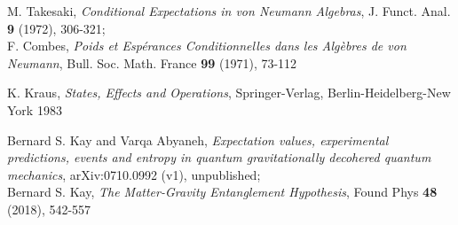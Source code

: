 \documentclass[12pt]{article}
\begin{document}
\begin{thebibliography}{References}
 M. Takesaki, \textit{Conditional Expectations in von Neumann Algebras}, J. Funct. Anal. {\bf{9}} (1972), 306-321;\\
F. Combes, \textit{Poids et Esp\'erances Conditionnelles dans les Alg\`ebres de von Neumann}, Bull. Soc. Math. France {\bf{99}} (1971), 73-112

 K. Kraus, \textit{States, Effects and Operations}, Springer-Verlag, Berlin-Heidelberg-New York 1983

  Bernard S. Kay and Varqa Abyaneh, \textit{Expectation values, experimental predictions, events and entropy in quantum gravitationally decohered quantum mechanics}, arXiv:0710.0992 (v1), unpublished;\\
Bernard S. Kay, \textit{The Matter-Gravity Entanglement Hypothesis}, Found Phys {\bf{48}} (2018), 542-557


\end{thebibliography}
\end{document}
